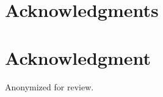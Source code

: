 \documentclass[conference,compsoc]{IEEEtran}
\begin{document}


\ifCLASSOPTIONcompsoc
  \section*{Acknowledgments}
\else
  \section*{Acknowledgment}
\fi
\ifanonymous
Anonymized for review.
\else



\fi



\newpage



\end{document}
